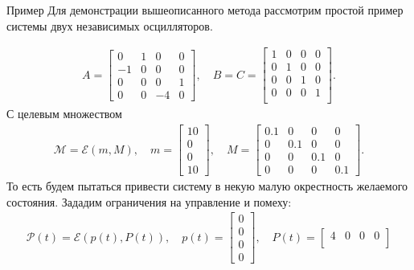 \begin{section}{Пример}
Для демонстрации вышеописанного метода рассмотрим простой пример системы двух независимых осцилляторов.

\begin{gather*}
    A = \begin{bmatrix}
        0 & 1 & 0 & 0 \\[0.3em]
        -1 & 0 & 0 & 0 \\[0.3em]
        0 & 0 & 0 & 1 \\[0.3em]
        0 & 0 & -4 & 0 
    \end{bmatrix}, \quad
    B = C = \begin{bmatrix}
        1 & 0 & 0 & 0 \\[0.3em]
        0 & 1 & 0 & 0 \\[0.3em]
        0 & 0 & 1 & 0 \\[0.3em]
        0 & 0 & 0 & 1 \\[0.3em]
    \end{bmatrix}.
\end{gather*}
С целевым множеством 
\begin{gather*}
    \mathcal{M} = \mathcal{E}(m, M), \quad
    m = \begin{bmatrix}
        10 \\[0.3em]
        0 \\[0.3em]
        0 \\[0.3em]
        10
    \end{bmatrix}, \quad
    M = \begin{bmatrix}
        0.1 & 0 & 0 & 0 \\[0.3em]
        0 & 0.1 & 0 & 0 \\[0.3em]
        0 & 0 & 0.1 & 0 \\[0.3em]
        0 & 0 & 0 & 0.1
    \end{bmatrix}.
\end{gather*}
То есть будем пытаться привести систему в некую малую окрестность желаемого состояния.
Зададим ограничения на управление и помеху:
\begin{gather*}
    \mathcal{P}(t) = \mathcal{E}(p(t), P(t)), \quad
    p(t) = \begin{bmatrix}
        0 \\[0.3em]
        0 \\[0.3em]
        0 \\[0.3em]
        0
    \end{bmatrix}, \quad
    P(t) = \begin{bmatrix}
        4 & 0 & 0 & 0 \\[0.3em]

\end{bmatrix}
\end{gather*}
\end{section}
